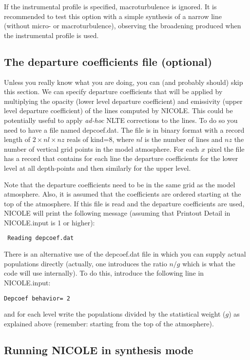 If the instrumental profile is specified, macroturbulence is ignored. It is
recommended to test this option with a simple synthesis of a narrow
line (without micro- or macroturbulence), observing the broadening
produced when the instrumental profile is used.


\subsection{The departure coefficients file (optional)}
\label{depcoef}

Unless you really know what you are doing, you can (and probably
should) skip this section.  We can specify departure coefficients that
will be applied by multiplying the opacity (lower level departure
coefficient) and emissivity (upper level departure coefficient) of the
lines computed by NICOLE. This could be potentially useful to apply
{\em ad-hoc} NLTE corrections to the lines. To do so you need to have
a file named depcoef.dat. The file is in binary format with a record
length of $2\times nl \times nz$ reals of kind=8, where $nl$ is the
number of lines and $nz$ the number of vertical grid points in the
model atmosphere. For each $x$ pixel the file has a record
that contains for each line the departure coefficients for the lower
level at all depth-points and then similarly for the upper level. 

Note that the departure coefficients need to be in the same grid as
the model atmosphere. Also, it is assumed that the coefficients are
ordered starting at the top of the atmosphere. If this file is read
and the departure coefficients are used, NICOLE will print the
following message (assuming that Printout Detail in NICOLE.input is 1
or higher):
\begin{verbatim}
 Reading depcoef.dat
\end{verbatim}

There is an alternative use of the depcoef.dat file in which you can
supply actual populations directly (actually, one introduces the ratio
$n/g$ which is what the code will use internally). To do this, introduce 
the following line in NICOLE.input:
\begin{verbatim}
Depcoef behavior= 2
\end{verbatim}
and for each level write the populations divided by the statistical weight
($g$) as explained above (remember: starting from the top of the atmosphere).

\subsection{Running NICOLE in synthesis mode}
\label{sec:runsyn}


